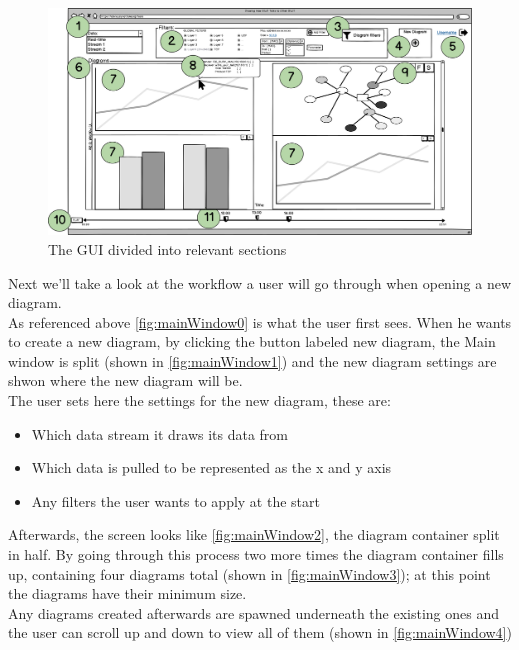 \documentclass[twoside, english, final]{Pflichtenheft}
\begin{document}
\vfill

\begin{figure}[ht]
	\centering
	\includegraphics[width=\textwidth]{Images/07MW.png}
	\caption{The GUI divided into relevant sections}
	\label{fig:mainWindow5}
\end{figure}

\vfill
\clearpage

Next we'll take a look at the workflow a user will go through when opening a new diagram.
\\
As referenced above \autoref{fig:mainWindow0} is what the user first sees. When he wants to create a new diagram, by clicking the button labeled new diagram, the Main window is split (shown in \autoref{fig:mainWindow1}) and the new diagram settings are shwon where the new diagram will be.
\\
The user sets here the settings for the new diagram, these are:
\\
\begin{itemize}
	\item{Which data stream it draws its data from}
	\item{Which data is pulled to be represented as the x and y axis}
	\item{Any filters the user wants to apply at the start}
\end{itemize}

Afterwards, the screen looks like \autoref{fig:mainWindow2}, the \gls{diagram container} split in half. By going through this process two more times the diagram container fills up, containing four diagrams total (shown in \autoref{fig:mainWindow3}); at this point the diagrams have their minimum size.
\\
Any diagrams created afterwards are spawned underneath the existing ones and the user can scroll up and down to view all of them (shown in \autoref{fig:mainWindow4}) 
\end{document}
